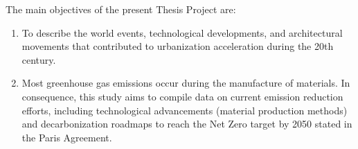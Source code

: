 The main objectives of the present Thesis Project are:

\begin{enumerate}
\item To describe the world events, technological developments, and architectural movements that contributed to urbanization acceleration during the 20th century.
\item Most greenhouse gas emissions occur during the manufacture of materials. In consequence, this study aims to compile data on current emission reduction efforts, including technological advancements (material production methods) and decarbonization roadmaps to reach the Net Zero target by 2050 stated in the Paris Agreement.
\end{enumerate}